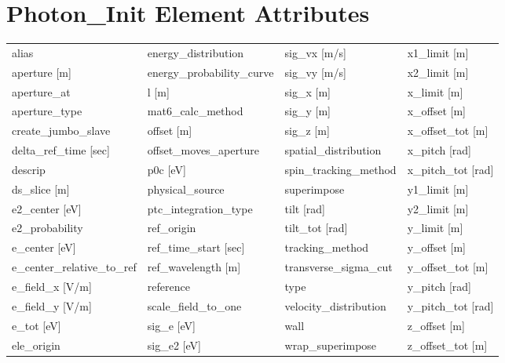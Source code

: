  \section{Photon_Init Element Attributes}
 \label{s:list.photon.init}
 
 \begin{tabular}{llll} \toprule
alias                            & energy_distribution              & sig_vx [m/s]                     & x1_limit [m]                     \\
aperture [m]                     & energy_probability_curve         & sig_vy [m/s]                     & x2_limit [m]                     \\
aperture_at                      & l [m]                            & sig_x [m]                        & x_limit [m]                      \\
aperture_type                    & mat6_calc_method                 & sig_y [m]                        & x_offset [m]                     \\
create_jumbo_slave               & offset [m]                       & sig_z [m]                        & x_offset_tot [m]                 \\
delta_ref_time [sec]             & offset_moves_aperture            & spatial_distribution             & x_pitch [rad]                    \\
descrip                          & p0c [eV]                         & spin_tracking_method             & x_pitch_tot [rad]                \\
ds_slice [m]                     & physical_source                  & superimpose                      & y1_limit [m]                     \\
e2_center [eV]                   & ptc_integration_type             & tilt [rad]                       & y2_limit [m]                     \\
e2_probability                   & ref_origin                       & tilt_tot [rad]                   & y_limit [m]                      \\
e_center [eV]                    & ref_time_start [sec]             & tracking_method                  & y_offset [m]                     \\
e_center_relative_to_ref         & ref_wavelength [m]               & transverse_sigma_cut             & y_offset_tot [m]                 \\
e_field_x [V/m]                  & reference                        & type                             & y_pitch [rad]                    \\
e_field_y [V/m]                  & scale_field_to_one               & velocity_distribution            & y_pitch_tot [rad]                \\
e_tot [eV]                       & sig_e [eV]                       & wall                             & z_offset [m]                     \\
ele_origin                       & sig_e2 [eV]                      & wrap_superimpose                 & z_offset_tot [m]                 \\
 \bottomrule
 \end{tabular}
 \vfill
 
